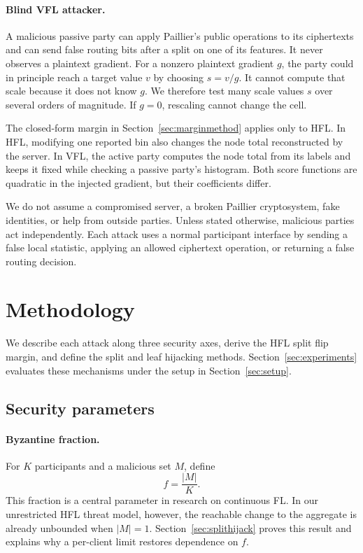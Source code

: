 \documentclass[11pt]{article}
\begin{document}
\paragraph{Blind VFL attacker.}
A malicious passive party can apply Paillier's public operations to its ciphertexts and can send false routing bits after a split on one of its features. It never observes a plaintext gradient. For a nonzero plaintext gradient $g$, the party could in principle reach a target value $v$ by choosing $s=v/g$. It cannot compute that scale because it does not know $g$. We therefore test many scale values $s$ over several orders of magnitude. If $g=0$, rescaling cannot change the cell.

The closed-form margin in Section~\ref{sec:marginmethod} applies only to HFL. In HFL, modifying one reported bin also changes the node total reconstructed by the server. In VFL, the active party computes the node total from its labels and keeps it fixed while checking a passive party's histogram. Both score functions are quadratic in the injected gradient, but their coefficients differ.

We do not assume a compromised server, a broken Paillier cryptosystem, fake identities, or help from outside parties. Unless stated otherwise, malicious parties act independently. Each attack uses a normal participant interface by sending a false local statistic, applying an allowed ciphertext operation, or returning a false routing decision.

\section{Methodology}
\label{sec:methodology}

We describe each attack along three security axes, derive the HFL split flip margin, and define the split and leaf hijacking methods. Section~\ref{sec:experiments} evaluates these mechanisms under the setup in Section~\ref{sec:setup}.

\subsection{Security parameters}
\label{sec:parameters}

\paragraph{Byzantine fraction.}
For $K$ participants and a malicious set $M$, define
\begin{equation}
f = \frac{\lvert M\rvert}{K}.
\label{eq:fdef}
\end{equation}
This fraction is a central parameter in research on continuous FL. In our unrestricted HFL threat model, however, the reachable change to the aggregate is already unbounded when $\lvert M\rvert=1$. Section~\ref{sec:splithijack} proves this result and explains why a per-client limit restores dependence on $f$.
\end{document}
